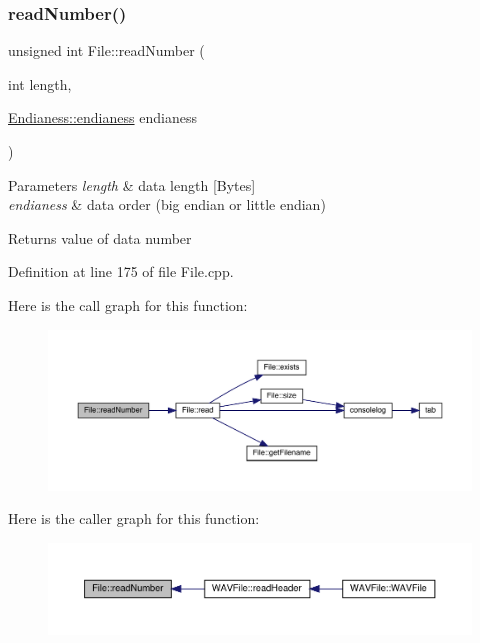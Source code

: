 \subsubsection{\texorpdfstring{read\+Number()}{readNumber()}}
{\footnotesize\ttfamily unsigned int File\+::read\+Number (\begin{DoxyParamCaption}\item[{int}]{length,  }\item[{\hyperlink{struct_file_1_1_endianess_ac80818ac42fdd0c9aa29d424e65fa37e}{Endianess\+::endianess}}]{endianess }\end{DoxyParamCaption})}


\begin{DoxyParams}{Parameters}
{\em length} & data length \mbox{[}Bytes\mbox{]} \\
\hline
{\em endianess} & data order (big endian or little endian) \\
\hline
\end{DoxyParams}
\begin{DoxyReturn}{Returns}
value of data number 
\end{DoxyReturn}


Definition at line 175 of file File.\+cpp.

Here is the call graph for this function\+:
\nopagebreak
\begin{figure}[H]
\begin{center}
\leavevmode
\includegraphics[width=350pt]{class_file_ab13f46c198a890f679351a2c9030e36d_cgraph}
\end{center}
\end{figure}
Here is the caller graph for this function\+:
\nopagebreak
\begin{figure}[H]
\begin{center}
\leavevmode
\includegraphics[width=350pt]{class_file_ab13f46c198a890f679351a2c9030e36d_icgraph}
\end{center}
\end{figure}
\mbox{\label{class_file_a01b5902198fefc46fe835f42386ce047}} 
